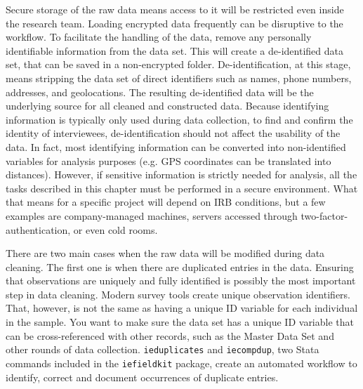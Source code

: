 Secure storage of the raw data means access to it will be restricted even inside the research team.
Loading encrypted data frequently can be disruptive to the workflow.
To facilitate the handling of the data, remove any personally identifiable information from the data set.
This will create a de-identified data set, that can be saved in a non-encrypted folder. 
De-identification,
at this stage, means stripping the data set of direct identifiers such as names, phone numbers, addresses, and geolocations.
The resulting de-identified data will be the underlying source for all cleaned and constructed data.
Because identifying information is typically only used during data collection, 
to find and confirm the identity of interviewees, 
de-identification should not affect the usability of the data.
In fact, most identifying information can be converted into non-identified variables for analysis purposes
(e.g. GPS coordinates can be translated into distances). 
However, if sensitive information is strictly needed for analysis,
all the tasks described in this chapter must be performed in a secure environment.
What that means for a specific project will depend on IRB conditions,
but a few examples are company-managed machines, 
servers accessed through two-factor-authentication,
or even cold rooms.

There are two main cases when the raw data will be modified during data cleaning.
The first one is when there are duplicated entries in the data.
Ensuring that observations are uniquely and fully identified
is possibly the most important step in data cleaning.
Modern survey tools create unique observation identifiers.
That, however, is not the same as having a unique ID variable for each individual in the sample.
You want to make sure the data set has a unique ID variable
that can be cross-referenced with other records, such as the Master Data Set
and other rounds of data collection.
\texttt{ieduplicates} and \texttt{iecompdup}, 
two Stata commands included in the \texttt{iefieldkit} 
package,
create an automated workflow to identify, correct and document
occurrences of duplicate entries. 

